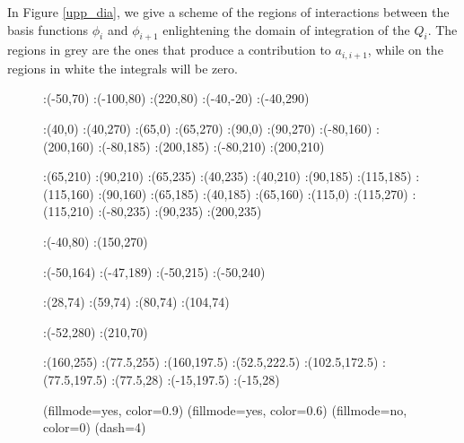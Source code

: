 In Figure \ref{upp_dia}, we give a scheme of the regions of interactions between the basis functions $\phi_i$ and $\phi_{i+1}$ enlightening the domain of integration of the $Q_i$. The regions in grey are the ones that produce a contribution to $a_{i,i+1}$, while on the regions in white the integrals will be zero.
\begin{figure}[h]
\figinit{0.8pt}
:(-50,70)
:(-100,80) :(220,80)
:(-40,-20) :(-40,290)

:(40,0) :(40,270)
:(65,0) :(65,270)
:(90,0) :(90,270)
%
:(-80,160) :(200,160)
:(-80,185) :(200,185)
:(-80,210) :(200,210)
%

:(65,210) :(90,210)
:(65,235) :(40,235) 
:(40,210) :(90,185)
:(115,185) :(115,160)
:(90,160) :(65,185)
:(40,185) :(65,160) 
:(115,0) :(115,270) 
:(115,210) :(-80,235) 
:(90,235) :(200,235) 

:(-40,80) :(150,270)

:(-50,164) :(-47,189) 
:(-50,215) :(-50,240) 

:(28,74) :(59,74) 
:(80,74) :(104,74) 

:(-52,280) :(210,70)

:(160,255) :(77.5,255)
:(160,197.5) :(52.5,222.5)
:(102.5,172.5) :(77.5,197.5)
:(77.5,28) :(-15,197.5)
:(-15,28) 


\figdrawbegin{}

\figset(fillmode=yes, color=0.9)
\figdrawline[29,30,10,8,29]
\figdrawline[29,31,32,33,29]
\figdrawline[30,34,14,16,30]
\figdrawline[35,36,37,34,35]
\figdrawline[34,38,7,9,34]
\figdrawline[38,29,15,13,38]
\figset(fillmode=yes, color=0.6)
\figdrawline[29,30,34,38,29]
\figset(fillmode=no, color=0)
\figdrawarrow[1,2]
\figdrawarrow[3,4]
\figdrawline[8,31]
\figdrawline[10,30]
\figdrawline[30,16]
\figdrawline[35,14]
\figdrawline[35,36]
\figdrawline[36,37]
\figdrawline[37,9]
\figdrawline[38,7]
\figdrawline[38,13]
\figdrawline[33,15]
\figdrawline[32,33]
\figdrawline[32,31]
\figset(dash=4)
\figdrawline[6,32]
\figdrawline[39,5]
\figdrawline[40,11]
\figdrawline[36,12]
\figdrawline[36,41]
\figdrawline[42,43]
\figdrawline[32,44]
\figdrawline[45,46]


\end{figure}
